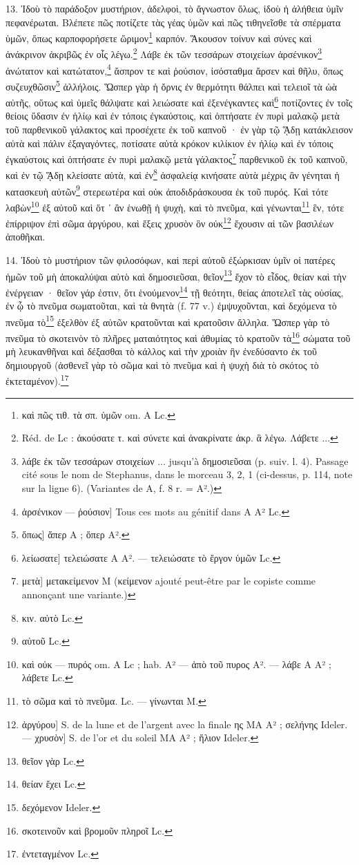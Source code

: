 \documentclass[a4paper, 11pt, oneside, polutonikogreek, french]{article}
\begin{document}
13. Ἰδοὺ τὸ παράδοξον μυστήριον, ἀδελφοὶ, τὸ ἄγνωστον ὅλως, ἰδοὺ ἡ ἀλήθεια ὑμῖν πεφανέρωται. Βλέπετε πῶς ποτίζετε τὰς γέας ὑμῶν καὶ πῶς τιθηνεῖσθε τὰ σπέρματα ὑμῶν, ὅπως καρποφορήσετε ὥριμον\footnote{καὶ πῶς τιθ. τὰ σπ. ὑμῶν om. A Lc.} καρπόν. Ἄκουσον τοίνυν καὶ σύνες καὶ ἀνάκρινον ἀκριβῶς ἐν οἷς λέγω.\footnote{Réd. de Lc : ἀκούσατε τ. καὶ σύνετε καὶ ἀνακρίνατε ἀκρ. ἃ λέγω. Λάβετε ...} Λάβε ἐκ τῶν τεσσάρων στοιχείων ἀρσένικον\footnote{λάβε ἐκ τῶν τεσσάρων στοιχείων ... jusqu'à δημοσιεῦσαι (p. suiv. l. 4). Passage cité sous le nom de Stephanus, dans le morceau 3, 2, 1 (ci-dessus, p. 114, note sur la ligne 6). (Variantes de A, f. 8 r. = A².)} ἀνώτατον καὶ κατώτατον,\footnote{ἀρσένικον --- ῥούσιον] Tous ces mots au génitif dans A A² Lc.} ἄσπρον τε καὶ ῥούσιον, ἰσόσταθμα ἄρσεν καὶ θῆλυ, ὅπως συζευχθῶσιν\footnote{ὅπως] ἅπερ A ; ὅπερ A².} ἀλλήλοις. Ὥσπερ γὰρ ἡ ὄρνις ἐν θερμότητι θάλπει καὶ τελειοῖ τὰ ὡὰ αὐτῆς, οὕτως καὶ ὑμεῖς θάλψατε καὶ λειώσατε καὶ ἐξενέγκαντες καὶ\footnote{λείωσατε] τελειώσατε A A². --- τελειώσατε τὸ ἔργον ὑμῶν Lc.} ποτίζοντες ἐν τοῖς θείοις ὕδασιν ἐν ἡλίῳ καὶ ἐν τόποις ἐγκαύστοις, καὶ ὀπτήσατε ἐν πυρὶ μαλακῷ μετὰ τοῦ παρθενικοῦ γάλακτος καὶ προσέχετε ἐκ τοῦ καπνοῦ · ἐν γὰρ τῷ ᾍδῃ κατάκλεισον αὐτὰ καὶ πάλιν ἐξαγαγόντες, ποτίσατε αὐτὰ κρόκον κιλίκιον ἐν ἡλίῳ καὶ ἐν τόποις ἐγκαύστοις καὶ ὀπτήσατε ἐν πυρὶ μαλακῷ μετὰ γάλακτος\footnote{μετὰ] μετακείμενον M (κείμενον ajouté peut-être par le copiste comme annonçant une variante.)} παρθενικοῦ ἐκ τοῦ καπνοῦ, καὶ ἐν τῷ ᾍδῃ κλείσατε αὐτὰ, καὶ ἐν\footnote{κιν. αὐτὸ Lc.} ἀσφαλείᾳ κινήσατε αὐτὰ μέχρις ἂν γένηται ἡ κατασκευὴ αὐτῶν\footnote{αὐτοῦ Lc.} στερεωτέρα καὶ οὐκ ἀποδιδράσκουσα ἐκ τοῦ πυρός. Καὶ τότε λαβὼν\footnote{καὶ οὐκ --- πυρός om. A Lc ; hab. A² --- ἀπὸ τοῦ πυρος A². --- λάβε A A² ; λάβετε Lc.} ἐξ αὐτοῦ καὶ ὅτ ᾽ ἂν ἑνωθῇ ἡ ψυχὴ, καὶ τὸ πνεῦμα, καὶ γένωνται\footnote{τὸ σῶμα καὶ τὸ πνεῦμα. Lc. --- γίνωνται M.} ἓν, τότε ἐπίρριψον ἐπὶ σῶμα ἀργύρου, καὶ ἕξεις χρυσὸν ὃν οὐκ\footnote{ἀργύρου] S. de la lune et de l'argent avec la finale ης MA A² ; σελήνης Ideler. --- χρυσὸν] S. de l'or et du soleil MA A² ; ἥλιον Ideler.} ἔχουσιν αἱ τῶν βασιλέων ἀποθῆκαι.

14. Ἰδοὺ τὸ μυστήριον τῶν φιλοσόφων, καὶ περὶ αὐτοῦ ἐξώρκισαν ὑμῖν οἱ πατέρες ἡμῶν τοῦ μὴ ἀποκαλύψαι αὐτὸ καὶ δημοσιεῦσαι, θεῖον\footnote{θεῖον γὰρ Lc.} ἔχον τὸ εἶδος, θείαν καὶ τὴν ἐνέργειαν · θεῖον γάρ ἐστιν, ὅτι ἑνούμενον\footnote{θείαν ἔχει Lc.} τῇ θεότητι, θείας ἀποτελεῖ τὰς οὐσίας, ἐν ᾧ τὸ πνεῦμα σωματοῦται, καὶ τὰ θνητὰ (f. 77 v.) ἐμψυχοῦνται, καὶ δεχόμενα τὸ πνεῦμα τὸ\footnote{δεχόμενον Ideler.} ἐξελθὸν ἐξ αὐτῶν κρατοῦνται καὶ κρατοῦσιν ἄλληλα. Ὥσπερ γὰρ τὸ πνεῦμα τὸ σκοτεινὸν τὸ πλῆρες ματαιότητος καὶ ἀθυμίας τὸ κρατοῦν τὰ\footnote{σκοτεινοῦν καὶ βρομοῦν πληροῖ Lc.} σώματα τοῦ μὴ λευκανθῆναι καὶ δέξασθαι τὸ κάλλος καὶ τὴν χροιὰν ἣν ἐνεδύσαντο ἐκ τοῦ δημιουργοῦ (ἀσθενεῖ γὰρ τὸ σῶμα καὶ τὸ πνεῦμα καὶ ἡ ψυχὴ διὰ τὸ σκότος τὸ ἐκτεταμένον).\footnote{ἐντεταγμένον Lc.}
\end{document}
